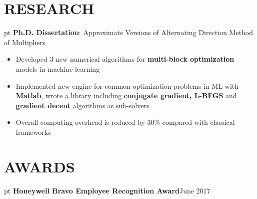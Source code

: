 \documentclass[10.5pt]{res} %
\begin{document}
\begin{resume}
\section{RESEARCH}  pt
	\textbf{Ph.D. Dissertation}: Approximate Versions of Alternating Direction Method of Multipliers
	\begin{itemize} pt
		\item Developed 3 new %
		 numerical algorithms for \textbf{multi-block optimization} models in machine learning  %
		\item Implemented new engine for common optimization problems in ML with \textbf{Matlab}, wrote a library including \textbf{conjugate gradient, L-BFGS} and \textbf{gradient decent} algorithms as sub-solvers
		\item Overall computing overhead is reduced by 30\% compared with classical frameworks
	\end{itemize}
%
\section{AWARDS}  pt
\textbf{Honeywell Bravo Employee Recognition Award}\hfill June 2017
%

\end{resume}
\end{document}
